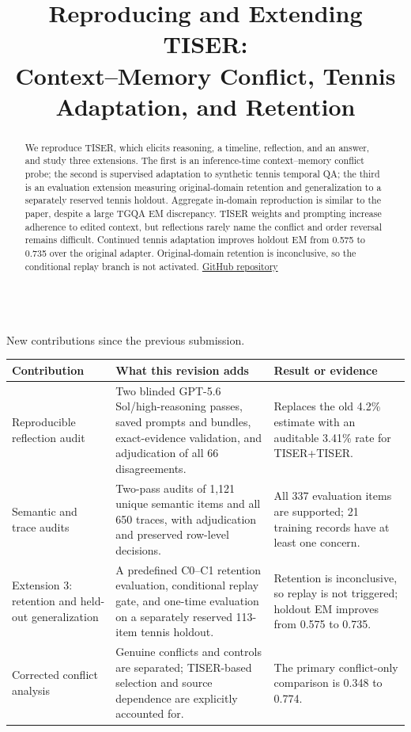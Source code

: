 \documentclass[conference]{IEEEtran}
\title{Reproducing and Extending TISER:\\
Context--Memory Conflict, Tennis Adaptation, and Retention}
\author{
\IEEEauthorblockN{
Gabriele Adorni s349308,
Alessandro Casadei s349386, \\
Taha Atabay Cetin s349501
}
\IEEEauthorblockA{
Politecnico di Torino\\
Deep Natural Language Processing
}
}
\begin{document}
\maketitle

\begin{abstract}
We reproduce TISER, which elicits reasoning, a timeline, reflection, and an answer, and study three extensions. The first is an inference-time context--memory conflict probe; the second is supervised adaptation to synthetic tennis temporal QA; the third is an evaluation extension measuring original-domain retention and generalization to a separately reserved tennis holdout. Aggregate in-domain reproduction is similar to the paper, despite a large TGQA EM discrepancy. TISER weights and prompting increase adherence to edited context, but reflections rarely name the conflict and order reversal remains difficult. Continued tennis adaptation improves holdout EM from 0.575 to 0.735 over the original adapter. Original-domain retention is inconclusive, so the conditional replay branch is not activated. \href{https://github.com/atabaycetin/tiser_temporal_reasoning_extension/tree/main}{GitHub repository}
\end{abstract}

\begin{center}
{\footnotesize \MakeUppercase{\tablename}~\thetable\\
New contributions since the previous submission.}\par
\vspace{0.35em}
\setlength{\tabcolsep}{2.2pt}
{\scriptsize
\begin{tabular}{@{}>{\raggedright\arraybackslash}p{}>{\raggedright\arraybackslash}p{}>{\raggedright\arraybackslash}p{}@{}}
\toprule
\textbf{Contribution} & \textbf{What this revision adds} & \textbf{Result or evidence} \\
\midrule
Reproducible reflection audit & Two blinded GPT-5.6 Sol/high-reasoning passes, saved prompts and bundles, exact-evidence validation, and adjudication of all 66 disagreements. & Replaces the old 4.2\% estimate with an auditable 3.41\% rate for TISER+TISER. \\
Semantic and trace audits & Two-pass audits of 1,121 unique semantic items and all 650 traces, with adjudication and preserved row-level decisions. & All 337 evaluation items are supported; 21 training records have at least one concern. \\
Extension 3: retention and held-out generalization & A predefined C0--C1 retention evaluation, conditional replay gate, and one-time evaluation on a separately reserved 113-item tennis holdout. & Retention is inconclusive, so replay is not triggered; holdout EM improves from 0.575 to 0.735. \\
Corrected conflict analysis & Genuine conflicts and controls are separated; TISER-based selection and source dependence are explicitly accounted for. & The primary conflict-only comparison is 0.348 to 0.774. \\
\bottomrule
\end{tabular}
}
\end{center}
\end{document}
